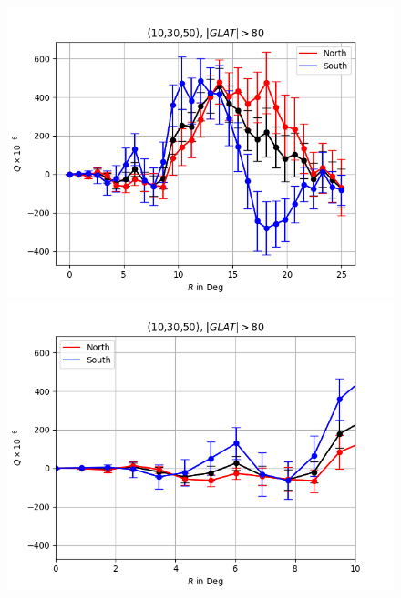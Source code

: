 \documentclass[english]{article}
\begin{document}
\begin{figure}
	\includegraphics[scale=0.5]{10_30_50_full.png}\includegraphics[scale=0.5]{10_30_50_upto_10.png}

\end{figure}
\end{document}
